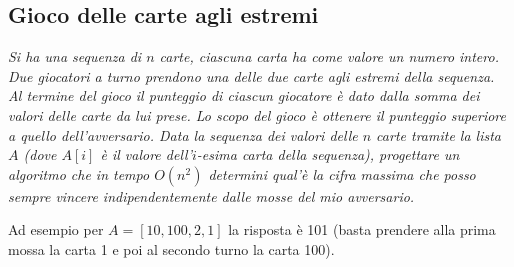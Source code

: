\subsection{Gioco delle carte agli estremi}
\textit{Si ha una sequenza di $n$ carte, ciascuna carta ha come valore un numero intero. Due giocatori a turno prendono una delle due carte agli estremi della sequenza. Al termine del gioco il punteggio di ciascun giocatore è dato dalla somma dei valori delle carte da lui prese. Lo scopo del gioco è ottenere il punteggio superiore a quello dell'avversario. Data la sequenza dei valori delle $n$ carte tramite la lista $A$ (dove $A[i]$ è il valore dell'$i$-esima carta della sequenza), progettare un algoritmo che in tempo $O(n^2)$ determini qual'è la cifra massima che posso sempre vincere indipendentemente dalle mosse del mio avversario.}

Ad esempio per $A = [10, 100, 2, 1]$ la risposta è 101 (basta prendere alla prima mossa la carta 1 e poi al secondo turno la carta 100).

